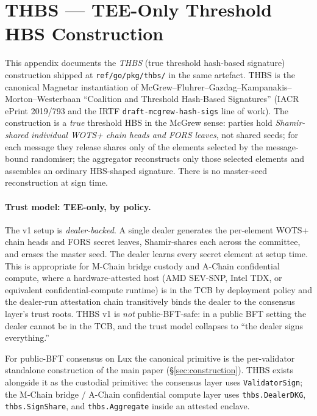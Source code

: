 \section{THBS --- TEE-Only Threshold HBS Construction}
\label{app:thbs}

This appendix documents the \emph{THBS} (true threshold hash-based
signature) construction shipped at \texttt{ref/go/pkg/thbs/} in the
same artefact. THBS is the canonical Magnetar instantiation of
McGrew--Fluhrer--Gazdag--Kampanakis--Morton--Westerbaan ``Coalition
and Threshold Hash-Based Signatures'' (IACR ePrint 2019/793 and the
IRTF \texttt{draft-mcgrew-hash-sigs} line of work). The construction
is a \emph{true} threshold HBS in the McGrew sense: parties hold
\emph{Shamir-shared individual WOTS+ chain heads and FORS leaves},
not shared seeds; for each message they release shares only of the
elements selected by the message-bound randomiser; the aggregator
reconstructs only those selected elements and assembles an ordinary
HBS-shaped signature. There is no master-seed reconstruction at
sign time.

\paragraph{Trust model: TEE-only, by policy.} The v1 setup is
\emph{dealer-backed}. A single dealer generates the per-element
WOTS+ chain heads and FORS secret leaves, Shamir-shares each across
the committee, and erases the master seed. The dealer learns every
secret element at setup time. This is appropriate for M-Chain bridge
custody and A-Chain confidential compute, where a hardware-attested
host (AMD SEV-SNP, Intel TDX, or equivalent confidential-compute
runtime) is in the TCB by deployment policy and the dealer-run
attestation chain transitively binds the dealer to the consensus
layer's trust roots. THBS v1 is \emph{not} public-BFT-safe: in a
public BFT setting the dealer cannot be in the TCB, and the trust
model collapses to ``the dealer signs everything.''

For public-BFT consensus on Lux the canonical primitive is the
per-validator standalone construction of the main paper
(\S\ref{sec:construction}). THBS exists alongside it as the
custodial primitive: the consensus layer uses
\texttt{ValidatorSign}; the M-Chain bridge / A-Chain confidential
compute layer uses \texttt{thbs.DealerDKG}, \texttt{thbs.SignShare},
and \texttt{thbs.Aggregate} inside an attested enclave.

